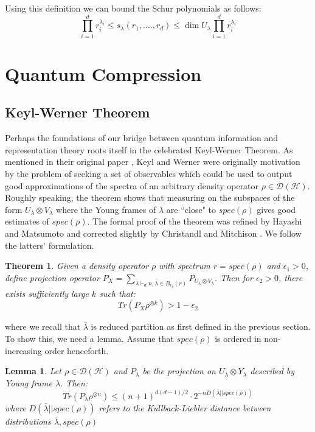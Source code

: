 \documentclass[12pt]{article}%
\newtheorem{thm}{Theorem}
\newtheorem{lemma}{Lemma}
\begin{document}
Using this definition we can bound the Schur polynomials as follows:
\begin{equation} \label{schur}
  \prod_{i=1}^d r_i^{\lambda_i} \leq s_{\lambda}(r_1,....,r_d) \leq \dim{U_\lambda} \prod_{i=1}^d r_i^{\lambda_i}
\end{equation}

\section{Quantum Compression}

\subsection{Keyl-Werner Theorem}
Perhaps the foundations of our bridge between quantum information and representation theory roots itself in the celebrated Keyl-Werner Theorem. As mentioned in their original paper \cite{KW}, Keyl and Werner were originally motivation by the problem of seeking a set of observables which could be used to output good approximations of the spectra of an arbitrary density operator $\rho \in \mathcal{D}(\mathcal{H})$.  Roughly speaking, the theorem shows that measuring on the subspaces of the form $U_\lambda \otimes V_\lambda$ where the Young frames of $\lambda$ are ``close" to $spec(\rho)$ gives good estimates of $spec(\rho)$. The formal proof of the theorem was refined by Hayashi and Matsumoto and corrected slightly by Christandl and Mitchison \cite{CM}. We follow the latters' formulation.
\begin{thm}
  Given a density operator $\rho$ with spectrum $r  = spec(\rho)$ and $\epsilon_1 > 0$, define projection operator $P_X = \sum_{\lambda \vdash_d n, \bar{\lambda} \in B_{\epsilon_1}(r)} P_{U_{\lambda} \otimes V_{\lambda}}$. Then for $\epsilon_2 > 0$, there exists sufficiently large $k$ such that:
  $$  Tr(P_X \rho^{\otimes k}) > 1 - \epsilon_2$$
\end{thm}

\noindent where we recall that $\bar{\lambda}$ is reduced partition as first defined in the previous section. To show this, we need a lemma.  Assume that $spec(\rho)$ is ordered in non-increasing order henceforth.

\begin{lemma}
  Let $\rho \in \mathcal{D}(\mathcal{H})$ and $P_{\lambda}$ be the projection on $U_{\lambda} \otimes Y_{\lambda}$ described by Young frame $\lambda$. Then:
  $$Tr(P_{\lambda}\rho^{\otimes n}) \leq (n+1)^{d(d-1)/2} \cdot 2^{-n D(\bar{\lambda}||spec(\rho))} $$
  where $D(\bar{\lambda}||spec(\rho))$ refers to the Kullback-Liebler distance between distributions $\bar{\lambda},spec(\rho)$
\end{lemma}
\end{document}
